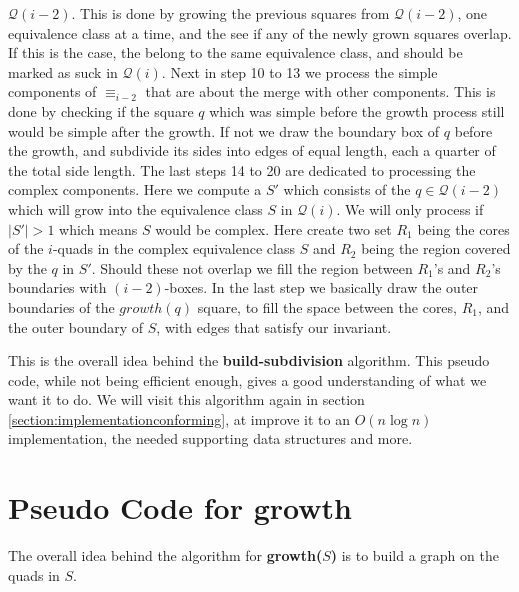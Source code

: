 $\mathcal{Q}(i-2)$. This is done by growing the previous squares from $\mathcal{Q}(i-2)$, one 
equivalence class at a time, and the see if any of the newly grown squares overlap. If this is 
the case, the belong to the same equivalence class, and should be marked as suck in 
$\mathcal{Q}(i)$. Next in step 10 to 13 we process the simple components of $\equiv_{i-2}$ that 
are about the merge with other components. This is done by checking if the square $q$ which was 
simple before the growth process still would be simple after the growth. If not we draw the 
boundary box of $q$ before the growth, and subdivide its sides into edges of equal length, each 
a quarter of the total side length. The last steps 14 to 20 are dedicated to processing the 
complex components. Here we compute a $S'$ which consists of the $q \in \mathcal{Q}(i-2)$ which 
will grow into the equivalence class $S$ in $\mathcal{Q}(i)$. We will only process if $|S'| > 1$ 
which means $S$ would be complex. Here create two set $R_1$ being the cores of the $i$-quads in 
the complex equivalence class $S$ and $R_2$ being the region covered by the $q$ in $S'$. Should 
these not overlap we fill the region between $R_1$'s and $R_2$'s boundaries with $(i-2)$-boxes. 
In the last step we basically draw the outer boundaries of the $growth(q)$ square, to fill the 
space between the cores, $R_1$, and the outer boundary of $S$, with edges that satisfy our 
invariant. 

This is the overall idea behind the \textbf{build-subdivision} algorithm. This pseudo code, 
while not being efficient enough, gives a good understanding of what we want it to do. We will 
visit this algorithm again in section \ref{section:implementationconforming}, at improve it to 
an $O(n \log n)$ implementation, the needed supporting data structures and more.

\section{Pseudo Code for \textbf{growth}}

The overall idea behind the algorithm for \textbf{growth($S$)} is to build a graph on the quads 
in $S$. 

